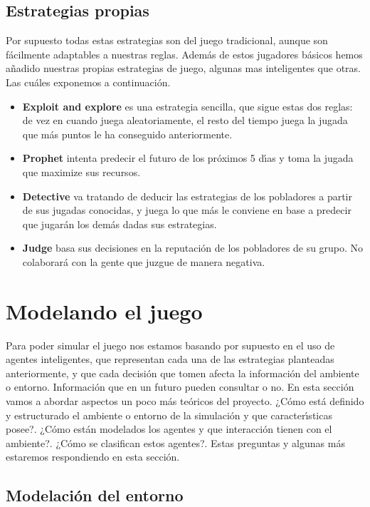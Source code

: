 \documentclass{article}
\begin{document}
\subsection{Estrategias propias}
Por supuesto todas estas estrategias son del juego tradicional, aunque son f\'acilmente adaptables a nuestras reglas. Adem\'as de estos jugadores b\'asicos
hemos a\~nadido nuestras propias estrategias de juego, algunas mas inteligentes que otras. Las cu\'ales exponemos a continuaci\'on.
\begin{itemize}
      \item \textbf{Exploit and explore} es una estrategia sencilla, que sigue estas dos reglas: de vez en cuando juega aleatoriamente, el resto del tiempo juega la jugada
            que m\'as puntos le ha conseguido anteriormente.
      \item \textbf{Prophet} intenta predecir el futuro de los pr\'oximos 5 d\'{\i}as y toma la jugada que maximize sus recursos.
      \item \textbf{Detective} va tratando de deducir las estrategias de los pobladores a partir de sus jugadas conocidas, y juega lo que m\'as le conviene en base a predecir
            que jugar\'an los dem\'as dadas sus estrategias.
      \item \textbf{Judge} basa sus decisiones en la reputaci\'on de los pobladores de su grupo. No colaborar\'a con la gente que juzgue de manera negativa.
\end{itemize}
\newpage

\section{Modelando el juego}
Para poder simular el juego nos estamos basando por supuesto en el uso de agentes inteligentes, que representan cada una de las estrategias planteadas anteriormente, y que
cada decisi\'on que tomen afecta la informaci\'on del ambiente o entorno. Informaci\'on que en un futuro pueden consultar o no. En esta secci\'on vamos a abordar aspectos
un poco m\'as te\'oricos del proyecto. ¿C\'omo est\'a definido y estructurado el ambiente o entorno de la simulaci\'on y que caracter\'{\i}sticas posee?. ¿C\'omo est\'an
modelados los agentes y que interacci\'on tienen con el ambiente?. ¿C\'omo se  clasifican estos agentes?. Estas preguntas y algunas m\'as estaremos respondiendo en esta
secci\'on.

\subsection{Modelaci\'on del entorno}
\end{document}
